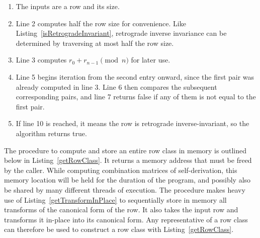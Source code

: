 \begin{enumerate}
\item The inputs are a row and its size.
\item Line 2 computes half the row size for convenience. Like Listing~\ref{isRetrogradeInvariant}, retrograde inverse invariance can be determined by traversing at most half the row size.
\item Line 3 computes $r_0 + r_{n - 1} \pmod{n}$ for later use.
\addtocounter{enumi}{1}
\item Line 5 begins iteration from the second entry onward, since the first pair was already computed in line 3. Line 6 then compares the subsequent corresponding pairs, and line 7 returns false if any of them is not equal to the first pair.
\addtocounter{enumi}{4}
\item If line 10 is reached, it means the row is retrograde inverse-invariant, so the algorithm returns true.
\end{enumerate}

The procedure to compute and store an entire row class in memory is outlined below in Listing~\ref{getRowClass}. It returns a memory address that must be freed by the caller. While computing combination matrices of self-derivation, this memory location will be held for the duration of the program, and possibly also be shared by many different threads of execution. The procedure makes heavy use of Listing~\ref{getTransformInPlace} to sequentially store in memory all transforms of the canonical form of the row. It also takes the input row and transforms it in-place into its canonical form. Any representative of a row class can therefore be used to construct a row class with Listing~\ref{getRowClass}.

